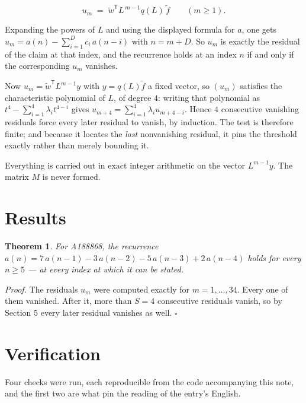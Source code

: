 \documentclass[11pt]{article}
\newtheorem{theorem}{Theorem}
\theoremstyle{definition}
\begin{document}
\[u_m \;=\; \tilde w^{\mathsf T} L^{\,m-1} q(L)\,\tilde f \qquad (m \ge 1).\]

Expanding the powers of $L$ and using the displayed formula for $a$, one gets $u_m = a(n) - \sum_{i=1}^{D} c_i\,a(n-i)$ with $n = m + D$. So $u_m$ is exactly the residual of the claim at that index, and the recurrence holds at an index $n$ if and only if the corresponding $u_m$ vanishes.

Now $u_m = \tilde w^{\mathsf T} L^{m-1} y$ with $y = q(L)\tilde f$ a fixed vector, so $(u_m)$ satisfies the characteristic polynomial of $L$, of degree $4$: writing that polynomial as $t^{4} - \sum_{i=1}^{4} \lambda_i t^{4-i}$ gives $u_{m+4} = \sum_{i=1}^{4} \lambda_i u_{m+4-i}$. Hence $4$ consecutive vanishing residuals force every later residual to vanish, by induction. The test is therefore finite; and because it locates the {\itshape last} nonvanishing residual, it pins the threshold exactly rather than merely bounding it.

Everything is carried out in exact integer arithmetic on the vector $L^{m-1}y$. The matrix $M$ is never formed.

\section{Results}

\begin{theorem} For A188868, the recurrence $a(n) = 7\,a(n-1) - 3\,a(n-2) - 5\,a(n-3) + 2\,a(n-4)$ holds for every $n \ge 5$ --- at every index at which it can be stated.\end{theorem}

{\itshape Proof.} The residuals $u_m$ were computed exactly for $m = 1,\dots,34$. Every one of them vanished. After it, more than $S = 4$ consecutive residuals vanish, so by Section 5 every later residual vanishes as well. $\square$

\section{Verification}

Four checks were run, each reproducible from the code accompanying this note, and the first two are what pin the reading of the entry's English.
\end{document}
